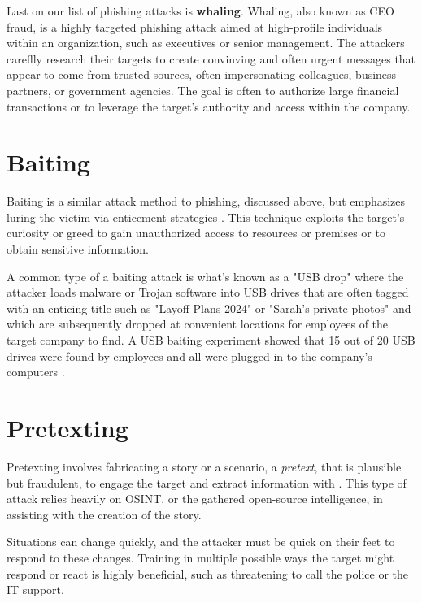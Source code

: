 Last on our list of phishing attacks is \textbf{whaling}. Whaling, also known as CEO fraud, is a highly targeted phishing attack aimed at high-profile individuals within an organization, such as executives or senior management. The attackers careflly research their targets to create convinving and often urgent messages that appear to come from trusted sources, often impersonating colleagues, business partners, or government agencies. The goal is often to authorize large financial transactions or to leverage the target's authority and access within the company.

\section{Baiting}

Baiting is a similar attack method to phishing, discussed above, but emphasizes luring the victim via enticement strategies \citep{conteh_cybersecurityrisks_2016, salahdine_social_2019}. This technique exploits the target's curiosity or greed to gain unauthorized access to resources or premises or to obtain sensitive information.

A common type of a baiting attack is what's known as a "USB drop" where the attacker loads malware or Trojan software into USB drives that are often tagged with an enticing title such as "Layoff Plans 2024" or "Sarah's private photos" and which are subsequently dropped at convenient locations for employees of the target company to find. A USB baiting experiment showed that 15 out of 20 USB drives were found by employees and all were plugged in to the company's computers \citep{wang_social_2021}.





\section{Pretexting}

Pretexting involves fabricating a story or a scenario, a \textit{pretext}, that is plausible but fraudulent, to engage the target and extract information with \citep{conteh_cybersecurityrisks_2016}. This type of attack relies heavily on OSINT, or the gathered open-source intelligence, in assisting with the creation of the story.

Situations can change quickly, and the attacker must be quick on their feet to respond to these changes. Training in multiple possible ways the target might respond or react is highly beneficial, such as threatening to call the police or the IT support.

